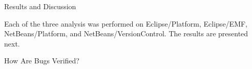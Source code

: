 \begin{section}{Results and Discussion} \label{sec:results}
	
	Each of the three analysis was performed on Eclipse/Platform, Eclipse/EMF, NetBeans/Platform, and NetBeans/VersionControl. The results are presented next.
	
% 	
% 	
% 	
	
\begin{subsection}{How Are Bugs Verified?}


\end{subsection}
\end{section}
